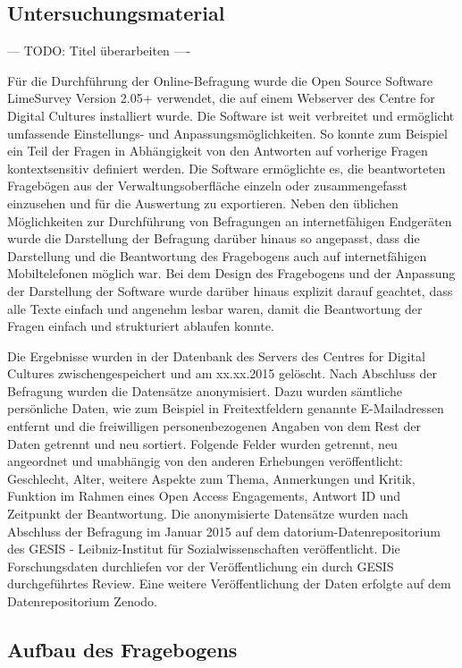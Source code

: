 \subsection{Untersuchungsmaterial} --- TODO: Titel überarbeiten ----

Für die Durchführung der Online-Befragung wurde die Open Source Software LimeSurvey Version 2.05+ verwendet, die auf einem Webserver des Centre for Digital Cultures installiert wurde. Die Software ist weit verbreitet und ermöglicht umfassende Einstellungs- und Anpassungsmöglichkeiten. So konnte zum Beispiel ein Teil der Fragen in Abhängigkeit von den Antworten auf vorherige Fragen kontextsensitiv definiert werden. Die Software ermöglichte es, die beantworteten Fragebögen aus der Verwaltungsoberfläche einzeln oder zusammengefasst einzusehen und für die Auswertung zu exportieren. Neben den üblichen Möglichkeiten zur Durchführung von Befragungen an internetfähigen Endgeräten wurde die Darstellung der Befragung darüber hinaus so angepasst, dass die Darstellung und die Beantwortung des Fragebogens auch auf internetfähigen Mobiltelefonen möglich war. Bei dem Design des Fragebogens und der Anpassung der Darstellung der Software wurde darüber hinaus explizit darauf geachtet, dass alle Texte einfach und angenehm lesbar waren, damit die Beantwortung der Fragen einfach und strukturiert ablaufen konnte.

Die Ergebnisse wurden in der Datenbank des Servers des Centres for Digital Cultures zwischengespeichert und am xx.xx.2015 gelöscht. Nach Abschluss der Befragung wurden die Datensätze anonymisiert. Dazu wurden sämtliche persönliche Daten, wie zum Beispiel in Freitextfeldern genannte E-Mailadressen entfernt und die freiwilligen personenbezogenen Angaben von dem Rest der Daten getrennt und neu sortiert. Folgende Felder wurden getrennt, neu angeordnet und unabhängig von den anderen Erhebungen veröffentlicht: Geschlecht, Alter, weitere Aspekte zum Thema, Anmerkungen und Kritik, Funktion im Rahmen eines Open Access Engagements, Antwort ID und Zeitpunkt der Beantwortung. Die anonymisierte Datensätze wurden nach Abschluss der Befragung im Januar 2015 auf dem datorium-Datenrepositorium des GESIS - Leibniz-Institut für Sozialwissenschaften veröffentlicht. Die Forschungsdaten durchliefen vor der Veröffentlichung ein durch GESIS durchgeführtes Review. Eine weitere Veröffentlichung der Daten erfolgte auf dem Datenrepositorium Zenodo.

\subsection{Aufbau des Fragebogens}

